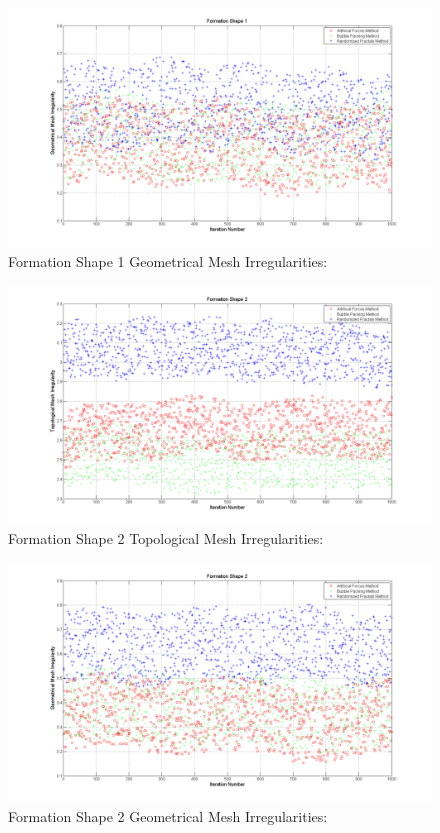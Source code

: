 \begin{figure}[H]
\caption{Formation Shape 1 Geometrical Mesh Irregularities:}
\centerline{\includegraphics[scale = 0.45]{Geometrical_Irr_1}}
\end{figure} 	

\begin{figure}[H]
\caption{Formation Shape 2 Topological Mesh Irregularities:}
\centerline{\includegraphics[scale = 0.45]{Topological_Irr_2}}
\end{figure} 	
				
\begin{figure}[H]
\caption{Formation Shape 2 Geometrical Mesh Irregularities:}
\centerline{\includegraphics[scale = 0.45]{Geometrical_Irr_2}}
\end{figure} 	
		
